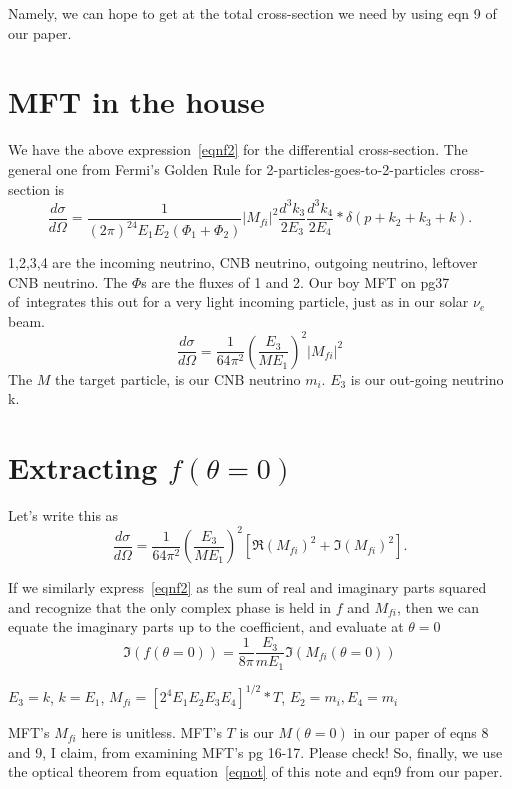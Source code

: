 \documentclass[reprint,onecolumn,superscriptaddress,preprintnumbers]{revtex4}%
\begin{document}
Namely, we can hope to get at the total cross-section we need by using eqn 9 of our paper.

\section{MFT in the house}
We have the above expression~\ref{eqnf2} for the differential cross-section. The general one from Fermi's Golden Rule for 2-particles-goes-to-2-particles cross-section is
\begin{equation}
\frac{d\sigma}{d\Omega} = \frac{1}{(2\pi)^24E_1E_2(\Phi_1+\Phi_2)} |M_{fi}|^2 \frac{d^3k_3}{2E_3} \frac{d^3k_4}{2E_4} *\delta(p+k_2+k_3+k).
\end{equation}

1,2,3,4 are the incoming neutrino, CNB neutrino, outgoing neutrino, leftover CNB neutrino. The $\Phi$s are the fluxes of 1 and 2. Our boy MFT on pg37 of~\cite{mft}integrates this out for a very light incoming particle, just as in our solar $\nu_e$ beam.
\begin{equation}
\frac{d\sigma}{d\Omega} = \frac{1}{64\pi^2}(\frac{E_3}{ME_1})^2 |M_{fi}|^2
\end{equation}
The $M$  the target particle, is our CNB neutrino $m_i$. $E_3$ is our out-going neutrino k. 

\section{Extracting $f(\theta=0)$}
Let's write this as 
\begin{equation}
\frac{d\sigma}{d\Omega} = \frac{1}{64\pi^2}(\frac{E_3}{ME_1})^2[\Re(M_{fi})^2+\Im(M_{fi})^2].
\end{equation}

If we similarly express~\ref{eqnf2} as the sum of real and imaginary parts squared and recognize that the only complex phase is held in $f$ and $M_{fi}$, then we can equate
the imaginary parts up to the coefficient, and evaluate at $\theta=0$
\begin{equation}
\Im (f(\theta=0)) = \frac{1}{8\pi}\frac{E_3}{mE_1}\Im(M_{fi}(\theta=0))
\end{equation}

$E_3 = k$, $k=E_1$, $M_{fi}=[2^4E_1E_2E_3E_4]^{1/2}*T$, $E_2=m_i, E_4=m_i$

MFT's $M_{fi}$ here is unitless. MFT's $T$ is our $M(\theta=0)$ in our paper of eqns 8 and 9, I claim, from examining MFT's pg 16-17. Please check! So, finally, we use the optical theorem from equation~\ref{eqnot} of this note and eqn9 from our paper.
\end{document}
